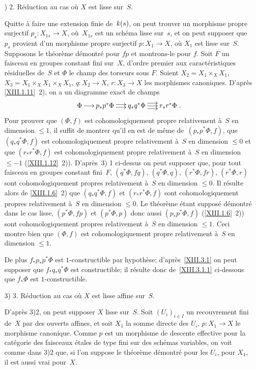 ) 2. R\'eduction au cas o\`u $X$ est lisse sur~$S$.\par\nopagebreak
Quitte \`a faire une extension finie de~$\mathit{k}(s)$, on peut trouver un
morphisme propre surjectif $p_s\colon X_{1s}\to X$, o\`u~$X_{1s}$
est un sch\'ema lisse sur~$s$, et on peut supposer que $p_s$
provient d'un morphisme propre surjectif $p\colon X_1 \to X$, o\`u
$X_1$ est lisse sur~$S$. Supposons le th\'eor\`eme
d\'emontr\'e pour $fp$ et montrons-le pour $f$. Soit $F$ un
faisceau en groupes constant fini sur~$X$, d'ordre premier aux
caract\'eristiques r\'esiduelles de~$S$ et $\Phi$ le champ des
torseurs sous $F$. Soient $X_2=X_1 \times_X X_1$, $X_3=X_1 \times_X
X_1 \times_X X_1$, $q\colon X_2 \to X$, $r\colon X_3 \to X$ les
morphismes canoniques. D'apr\`es \ref{XIII.1.11}~2), on a un
diagramme exact de champs
$$
\xymatrix@C=.5cm{{\Phi}\ar[r]&{p_*p^*\Phi}\ar@<2pt>[r]\ar@<-2pt>[r]&{q_*q^*\Phi}\ar@<4pt>[r]\ar[r]\ar@<-4pt>[r]&{r_*r^*\Phi}}\quoi.
$$
Pour prouver que $(\Phi,f)$ est cohomologiquement propre relativement
\`a~$S$ en dimension $\le 1$, il suffit de montrer qu'il en est de
m\^eme de~$(p_*p^*\Phi,f)$, que $(q_*q^*\Phi, f )$ est
cohomologiquement propre relativement \`a~$S$ en dimension $\le 0$
et que $(r_*r^*\Phi,f)$ est cohomologiquement propre relativement
\`a~$S$ en dimension $\le -1$ (\ref{XIII.1.12}~2)). D'apr\`es~3) 1
ci-dessus on peut supposer que, pour tout faisceau en groupes constant
fini~$F$, $(q^*\Phi,fq)$, $(q^*\Phi,q)$, $(r^*\Phi,fr)$, $(r^*\Phi,r)$
sont cohomologiquement propres relativement \`a~$S$ en dimension
$\le 0$. Il r\'esulte alors de \ref{XIII.1.6}~2) que
$(q_*q^*\Phi,f)$ et $(r_*r^*\Phi,f)$ sont cohomologiquement propres
relativement \`a~$S$ en dimension $\le 0$. Le th\'eor\`eme
\'etant suppos\'e d\'emontr\'e dans le cas lisse, $(p^*\Phi,
fp)$ et $(p^*\Phi,p)$ donc aussi $(p_*p^*\Phi,f)$ (\ref{XIII.1.6}~2))
sont cohomologiquement propres relativement \`a~$S$ en dimension
$\le 1$. Ceci montre bien que $(\Phi,f)$ est cohomologiquement propre
relativement \`a~$S$ en dimension $\le 1$.

De plus $f_*p_*p^*\Phi$ est $1$-constructible par hypoth\`ese;
d'apr\`es~\ref{XIII.3.1} on peut supposer que $f_*q_*q^*\Phi$ est
constructible; il r\'esulte donc de~\ref{XIII.3.1.1} ci-dessous que
$f_*\Phi$ est $1$-constructible.

3) 3. R\'eduction au cas o\`u $X$ est lisse affine sur~$S$.

D'apr\`es 3)2, on peut supposer $X$ lisse sur~$S$. Soit $(U_i)_{i\in
I}$ un recouvrement fini de~$X$ par des ouverts affines, et soit $X_1$
la somme directe des $U_i$, $p\colon X_1 \to X$ le morphisme
canonique. Comme $p$ est un morphisme de descente effective pour la
cat\'egorie des faisceaux \'etales de type fini sur des
sch\'emas variables, on voit comme dans 3)2 que, si l'on suppose le
th\'eor\`eme d\'emontr\'e pour les $U_i$, \ie pour $X_1$, il
est aussi vrai pour~$X$.

